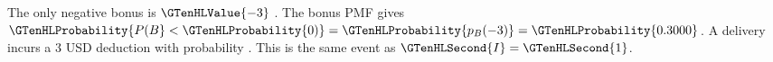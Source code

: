 The only negative bonus is $\GTenHLValue{-3}$ . The bonus PMF gives $\GTenHLProbability{P(B}<\GTenHLProbability{0)}=\GTenHLProbability{p_{B}(-3)}=\GTenHLProbability{0.3000}$. A delivery incurs a 3 USD deduction with probability . This is the same event as $\GTenHLSecond{I}=\GTenHLSecond{1}$.



